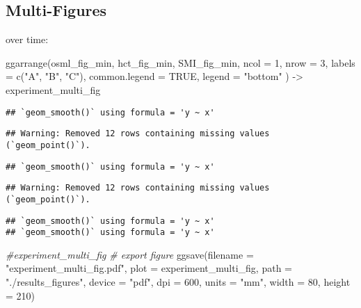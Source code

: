 \documentclass[
]{article}
\newenvironment{Shaded}{\begin{snugshade}}{\end{snugshade}}
\newcommand{\AttributeTok}[1]{\textcolor[rgb]{0.77,0.63,0.00}{#1}}
\newcommand{\CommentTok}[1]{\textcolor[rgb]{0.56,0.35,0.01}{\textit{#1}}}
\newcommand{\ConstantTok}[1]{\textcolor[rgb]{0.00,0.00,0.00}{#1}}
\newcommand{\DecValTok}[1]{\textcolor[rgb]{0.00,0.00,0.81}{#1}}
\newcommand{\FunctionTok}[1]{\textcolor[rgb]{0.00,0.00,0.00}{#1}}
\newcommand{\NormalTok}[1]{#1}
\newcommand{\OtherTok}[1]{\textcolor[rgb]{0.56,0.35,0.01}{#1}}
\newcommand{\StringTok}[1]{\textcolor[rgb]{0.31,0.60,0.02}{#1}}
\begin{document}
\hypertarget{multi-figures}{%
\subsection{Multi-Figures}\label{multi-figures}}

over time:

\begin{Shaded}
\begin{Highlighting}[]
\FunctionTok{ggarrange}\NormalTok{(osml\_fig\_min, }
\NormalTok{          hct\_fig\_min, }
\NormalTok{          SMI\_fig\_min,}
          \AttributeTok{ncol =} \DecValTok{1}\NormalTok{, }\AttributeTok{nrow =} \DecValTok{3}\NormalTok{,}
          \AttributeTok{labels =} \FunctionTok{c}\NormalTok{(}\StringTok{"A"}\NormalTok{, }\StringTok{"B"}\NormalTok{, }\StringTok{"C"}\NormalTok{),}
          \AttributeTok{common.legend =} \ConstantTok{TRUE}\NormalTok{,}
          \AttributeTok{legend =} \StringTok{"bottom"}
\NormalTok{          ) }\OtherTok{{-}\textgreater{}}\NormalTok{ experiment\_multi\_fig}
\end{Highlighting}
\end{Shaded}

\begin{verbatim}
## `geom_smooth()` using formula = 'y ~ x'
\end{verbatim}

\begin{verbatim}
## Warning: Removed 12 rows containing missing values (`geom_point()`).
\end{verbatim}

\begin{verbatim}
## `geom_smooth()` using formula = 'y ~ x'
\end{verbatim}

\begin{verbatim}
## Warning: Removed 12 rows containing missing values (`geom_point()`).
\end{verbatim}

\begin{verbatim}
## `geom_smooth()` using formula = 'y ~ x'
## `geom_smooth()` using formula = 'y ~ x'
\end{verbatim}

\begin{Shaded}
\begin{Highlighting}[]
\CommentTok{\#experiment\_multi\_fig}
\CommentTok{\# export figure}
\FunctionTok{ggsave}\NormalTok{(}\AttributeTok{filename =} \StringTok{"experiment\_multi\_fig.pdf"}\NormalTok{,}
       \AttributeTok{plot =}\NormalTok{ experiment\_multi\_fig,}
       \AttributeTok{path =} \StringTok{"./results\_figures"}\NormalTok{,}
       \AttributeTok{device =} \StringTok{"pdf"}\NormalTok{,}
       \AttributeTok{dpi =} \DecValTok{600}\NormalTok{,}
       \AttributeTok{units =} \StringTok{"mm"}\NormalTok{,}
       \AttributeTok{width =} \DecValTok{80}\NormalTok{, }\AttributeTok{height =} \DecValTok{210}\NormalTok{)}
\end{Highlighting}
\end{Shaded}
\end{document}

